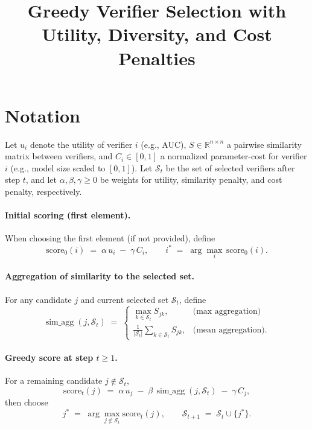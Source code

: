 \documentclass{article}
\title{Greedy Verifier Selection with Utility, Diversity, and Cost Penalties}
\author{}
\date{}
\begin{document}
\maketitle

\section*{Notation}
Let $u_i$ denote the utility of verifier $i$ (e.g., AUC), $S \in \mathbb{R}^{n\times n}$ a pairwise similarity matrix between verifiers, and $C_i \in [0,1]$ a normalized parameter-cost for verifier $i$ (e.g., model size scaled to $[0,1]$). Let $\mathcal{S}_t$ be the set of selected verifiers after step $t$, and let $\alpha,\beta,\gamma \ge 0$ be weights for utility, similarity penalty, and cost penalty, respectively.

\paragraph{Initial scoring (first element).} When choosing the first element (if not provided), define
\begin{equation}
\label{eq:initial-score}
\text{score}_0(i) \;=\; \alpha\,u_i \; - \; \gamma\,C_i,\qquad i^* \;=\; \arg\max_i\, \text{score}_0(i).
\end{equation}

\paragraph{Aggregation of similarity to the selected set.} For any candidate $j$ and current selected set $\mathcal{S}_t$, define
\begin{equation}
\label{eq:sim-agg}
\operatorname{sim\_agg}(j, \mathcal{S}_t) \;=\;
\begin{cases}
\max\limits_{k\in \mathcal{S}_t} S_{jk}, & \text{(max aggregation)} \\
\frac{1}{|\mathcal{S}_t|} \sum\limits_{k\in \mathcal{S}_t} S_{jk}, & \text{(mean aggregation)}.
\end{cases}
\end{equation}

\paragraph{Greedy score at step $t\ge 1$.} For a remaining candidate $j\notin \mathcal{S}_t$,
\begin{equation}
\label{eq:greedy-score}
\text{score}_t(j) \;=\; \alpha\,u_j \; - \; \beta\,\operatorname{sim\_agg}(j, \mathcal{S}_t) \; - \; \gamma\,C_j,
\end{equation}
then choose
\begin{equation}
\label{eq:argmax-step}
 j^* \;=\; \arg\max_{j\notin \mathcal{S}_t} \text{score}_t(j),\qquad \mathcal{S}_{t+1} \;=\; \mathcal{S}_t\cup\{j^*\}.
\end{equation}
\end{document}
